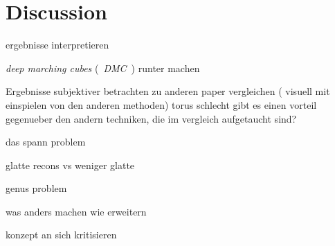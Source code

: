 \chapter{Discussion}
\label{sec:dicussion}
ergebnisse interpretieren

\emph{deep marching cubes} (~\emph{DMC}~) runter machen

Ergebnisse subjektiver betrachten
zu anderen paper vergleichen ( visuell mit einspielen von den anderen methoden)
torus schlecht
gibt es einen vorteil gegenueber den andern techniken, die im vergleich aufgetaucht sind?

das spann problem

glatte recons vs weniger glatte

genus problem

was anders machen
wie erweitern

konzept an sich kritisieren

